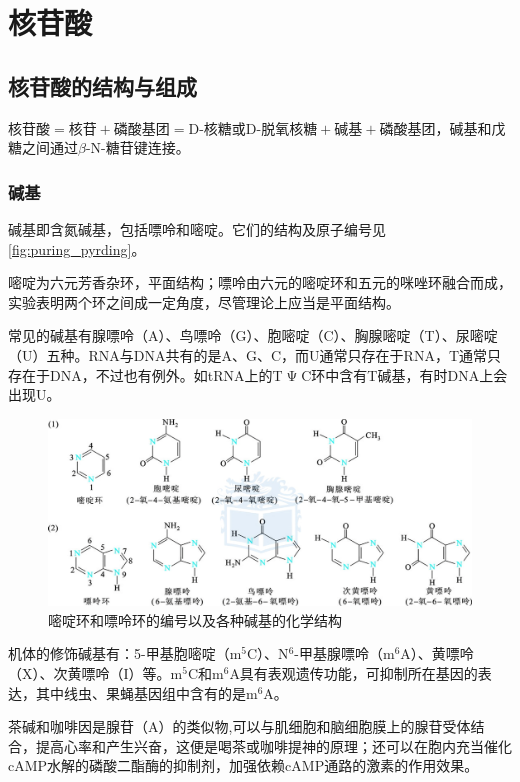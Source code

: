 \section{核苷酸}

\subsection{核苷酸的结构与组成}

$\text{核苷酸}=\text{核苷}+\text{磷酸基团}=\text{D-核糖或D-脱氧核糖}+\text{碱基}+\text{磷酸基团}$，碱基和戊糖之间通过$\beta$-N-糖苷键连接。

\subsubsection{碱基}

碱基即含氮碱基，包括嘌呤和嘧啶。它们的结构及原子编号见\autoref{fig:puring_pyrding}。

嘧啶为六元芳香杂环，平面结构；嘌呤由六元的嘧啶环和五元的咪唑环融合而成，实验表明两个环之间成一定角度，尽管理论上应当是平面结构。

常见的碱基有腺嘌呤（A）、鸟嘌呤（G）、胞嘧啶（C）、胸腺嘧啶（T）、尿嘧啶（U）五种。RNA与DNA共有的是A、G、C，而U通常只存在于RNA，T通常只存在于DNA，不过也有例外。如tRNA上的T$\upPsi$C环中含有T碱基，有时DNA上会出现U。
\begin{figure}
	\centering
	\includegraphics[width=\linewidth]{Pics/嘧啶环和嘌呤环的编号以及各种碱基的化学结构}
	\caption{嘧啶环和嘌呤环的编号以及各种碱基的化学结构}
	\label{fig:puring_pyrding}
\end{figure}


机体的修饰碱基有：5-甲基胞嘧啶（m$^{5}$C）、N$^{6}$-甲基腺嘌呤（m$^{6}$A）、黄嘌呤（X）、次黄嘌呤（I）等。m$^{5}$C和m$^{6}$A具有表观遗传功能，可抑制所在基因的表达，其中线虫、果蝇基因组中含有的是m$^{6}$A。

茶碱和咖啡因是腺苷（A）的类似物,可以与肌细胞和脑细胞膜上的腺苷受体结合，提高心率和产生兴奋，这便是喝茶或咖啡提神的原理；还可以在胞内充当催化cAMP水解的磷酸二酯酶的抑制剂，加强依赖cAMP通路的激素的作用效果。

